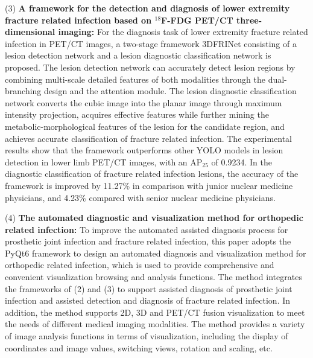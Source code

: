 \begin{eabstract}
    (3) \textbf{A framework for the detection and diagnosis of lower extremity fracture related infection based on \(^{18}\)F-FDG PET/CT three-dimensional imaging: }For the diagnosis task of lower extremity fracture related infection in PET/CT images, a two-stage framework 3DFRINet consisting of a lesion detection network and a lesion diagnostic classification network is proposed. The lesion detection network can accurately detect lesion regions by combining multi-scale detailed features of both modalities through the dual-branching design and the attention module. The lesion diagnostic classification network converts the cubic image into the planar image through maximum intensity projection, acquires effective features while further mining the metabolic-morphological features of the lesion for the candidate region, and achieves accurate classification of fracture related infection. The experimental results show that the framework outperforms other YOLO models in lesion detection in lower limb PET/CT images, with an AP\(_{25}\) of 0.9234. In the diagnostic classification of fracture related infection lesions, the accuracy of the framework is improved by 11.27\% in comparison with junior nuclear medicine physicians, and 4.23\% compared with senior nuclear medicine physicians.

    (4) \textbf{The automated diagnostic and visualization method for orthopedic related infection: }To improve the automated assisted diagnosis process for prosthetic joint infection and fracture related infection, this paper adopts the PyQt6 framework to design an automated diagnosis and visualization method for orthopedic related infection, which is used to provide comprehensive and convenient visualization browsing and analysis functions. The method integrates the frameworks of (2) and (3) to support assisted diagnosis of prosthetic joint infection and assisted detection and diagnosis of fracture related infection. In addition, the method supports 2D, 3D and PET/CT fusion visualization to meet the needs of different medical imaging modalities. The method provides a variety of image analysis functions in terms of visualization, including the display of coordinates and image values, switching views, rotation and scaling, etc.

\end{eabstract}

